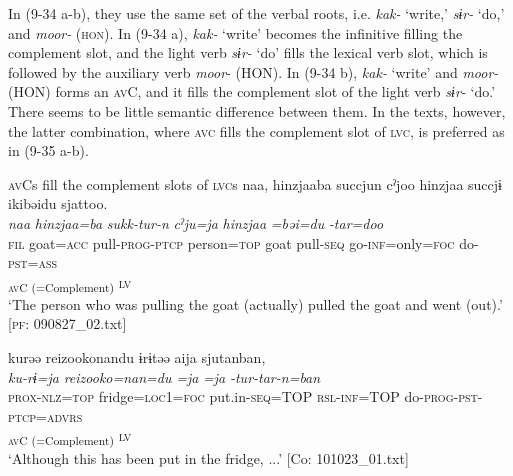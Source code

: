 In (9-34 a-b), they use the same set of the verbal roots, i.e. \textit{kak-} ‘write,’ \textit{sɨr-} ‘do,’ and \textit{moor-} (\textsc{hon}). In (9-34 a), \textit{kak-} ‘write’ becomes the infinitive filling the complement slot, and the light verb \textit{sɨr-} ‘do’ fills the lexical verb slot, which is followed by the auxiliary verb \textit{moor}{}- (HON). In (9-34 b), \textit{kak-} ‘write’ and \textit{moor-} (HON) forms an \textsc{av}C, and it fills the complement slot of the light verb \textit{sɨr-} ‘do.’ There seems to be little semantic difference between them. In the texts, however, the latter combination, where \textsc{avc} fills the complement slot of \textsc{lvc}, is preferred as in (9-35 a-b).

\ea   \textsc{av}Cs fill the complement slots of \textsc{lvc}s \label{ex:9.35}
\ea \label{ex:9.35a}%
 \gllll  naa,  hinzjaaba  succjun  cˀjoo  hinzjaa   succjɨ  ikibəidu  sjattoo.\\
      \textit{naa}  \textit{hinzjaa=ba}  \textit{sukk-tur-n}  \textit{cˀju=ja}  \textit{hinzjaa}  \textit{}  \textit{=bəi=du}  \textit{-tar=doo}\\
      \textsc{fil}  goat=\textsc{acc}  pull-\textsc{prog}-\textsc{ptcp}  person=\textsc{top}  goat pull-\textsc{seq}  go-\textsc{inf}=only=\textsc{foc}  do-\textsc{pst}=\textsc{ass}\\
      [Lex. Verb  Aux. Verb]\textsubscript{\textsc{av}C (=Complement)}  \textsc{lv}\\
      \glt       ‘The person who was pulling the goat (actually) pulled the goat and went (out).’ [\textsc{pf}: 090827\_02.txt]

\ex \label{ex:9.35b}%
\gllll kurəə  {\textbar}reizooko{\textbar}nandu  ɨrɨtəə  aija   sjutanban,\\
      \textit{ku-rɨ=ja}  \textit{reizooko=nan=du}  \textit{=ja}  \textit{=ja} \textit{-tur-tar-n=ban}\\
      \textsc{prox}-\textsc{nlz}=\textsc{top}  fridge=\textsc{loc}1=\textsc{foc}  put.in{}-\textsc{seq}=TOP  \textsc{rsl}-\textsc{inf}=TOP  do-\textsc{prog}-\textsc{pst}-\textsc{ptcp}=\textsc{advrs}\\
          [Lex. Verb  Aux. Verb]\textsubscript{ \textsc{av}C (=Complement)}  \textsc{lv}      \\
      \glt       ‘Although this has been put in the fridge, ...’ [Co: 101023\_01.txt]
    \z
\z

